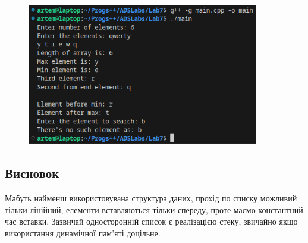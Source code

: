 \documentclass[12pt]{extarticle}
\begin{document}
\begin{figure}[H]
    \centering
    \includegraphics[width=0.90\textwidth]{Screenshot_20231101_083711.png}
    \caption{}
\end{figure}
\subsection*{Висновок} 
Мабуть найменш використовувана структура даних, прохід по списку можливий тільки лінійний, 
елементи вставляються тільки спереду, проте маємо константний час вставки. Зазвичай односторонній список є
реалізацією стеку, звичайно якщо використання динамічної пам'яті доцільне.
\end{document}
